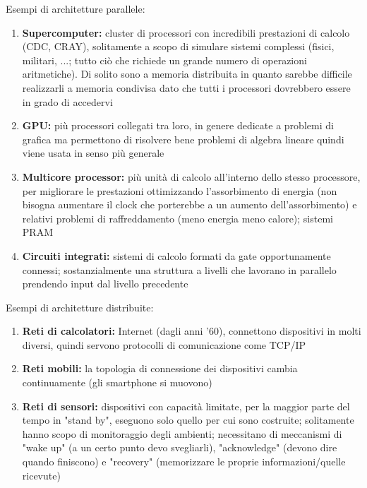 Esempi di architetture parallele: 
\begin{enumerate}
	\item \textbf{Supercomputer:} cluster di processori con incredibili prestazioni di calcolo (CDC, CRAY), solitamente a scopo di simulare sistemi complessi (fisici, militari, ...; tutto ciò che richiede un grande numero di operazioni aritmetiche). Di solito sono a memoria distribuita in quanto sarebbe difficile realizzarli a memoria condivisa dato che tutti i processori dovrebbero essere in grado di accedervi
	
	\item \textbf{GPU:} più processori collegati tra loro, in genere dedicate a problemi di grafica ma permettono di risolvere bene problemi di algebra lineare quindi viene usata in senso più generale
	
	\item \textbf{Multicore processor:} più unità di calcolo all'interno dello stesso processore, per migliorare le prestazioni ottimizzando l'assorbimento di energia (non bisogna aumentare il clock che porterebbe a un aumento dell'assorbimento) e relativi problemi di raffreddamento (meno energia meno calore); sistemi PRAM
	
	\item \textbf{Circuiti integrati:} sistemi di calcolo formati da gate opportunamente connessi; sostanzialmente una struttura a livelli che lavorano in parallelo prendendo input dal livello precedente
\end{enumerate}

Esempi di architetture distribuite:
\begin{enumerate}
	\item \textbf{Reti di calcolatori:} Internet (dagli anni '60), connettono dispositivi in molti diversi, quindi servono protocolli di comunicazione come TCP/IP
	
	\item \textbf{Reti mobili:} la topologia di connessione dei dispositivi cambia continuamente (gli smartphone si muovono)
	
	\item \textbf{Reti di sensori:} dispositivi con capacità limitate, per la maggior parte del tempo in "stand by", eseguono solo quello per cui sono costruite; solitamente hanno scopo di monitoraggio degli ambienti; necessitano di meccanismi di "wake up" (a un certo punto devo svegliarli), "acknowledge" (devono dire quando finiscono) e "recovery" (memorizzare le proprie informazioni/quelle ricevute)
\end{enumerate}

